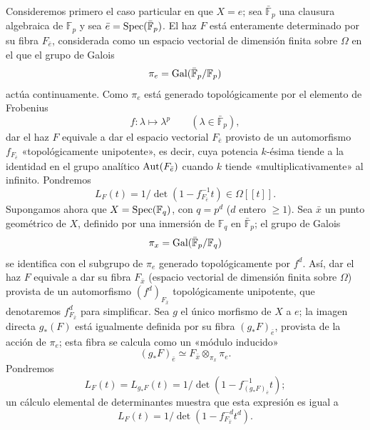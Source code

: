 Consideremos primero el caso particular en que $X=e$; sea $\bar{\mathbb F}_p$ una clausura algebraica de $\mathbb F_p$ y sea $\bar e=\operatorname{Spec}(\bar{\mathbb F}_p)$. El haz $F$ está enteramente determinado por su fibra $F_{\bar e}$, considerada como un espacio vectorial de dimensión finita sobre $\Omega$ en el que el grupo de Galois
\[
\pi_e=\operatorname{Gal}(\bar{\mathbb F}_p/\mathbb F_p)
\]
actúa continuamente. Como $\pi_e$ está generado topológicamente por el elemento de Frobenius
\[
f: \lambda\longmapsto \lambda^p\qquad(\lambda\in\bar{\mathbb F}_p),
\]
dar el haz $F$ equivale a dar el espacio vectorial $F_{\bar e}$ provisto de un automorfismo $f_{F_{\bar e}}$ «topológicamente unipotente», es decir, cuya potencia $k$-ésima tiende a la identidad en el grupo analítico $\operatorname{Aut}(F_{\bar e})$ cuando $k$ tiende «multiplicativamente» al infinito. Pondremos
\[
L_F(t)=1/\det(1-f_{F_{\bar e}}^{-1}t)\in\Omega[[t]].
\]
Supongamos ahora que $X=\operatorname{Spec}(\mathbb F_q)$, con $q=p^d$ ($d$ entero $\ge1$). Sea $\bar x$ un punto geométrico de $X$, definido por una inmersión de $\mathbb F_q$ en $\bar{\mathbb F}_p$; el grupo de Galois
\[
\pi_x=\operatorname{Gal}(\bar{\mathbb F}_p/\mathbb F_q)
\]
se identifica con el subgrupo de $\pi_e$ generado topológicamente por $f^d$. Así, dar el haz $F$ equivale a dar su fibra $F_{\bar x}$ (espacio vectorial de dimensión finita sobre $\Omega$) provista de un automorfismo $(f^d)_{F_{\bar x}}$ topológicamente unipotente, que denotaremos $f^d_{F_{\bar x}}$ para simplificar. Sea $g$ el único morfismo de $X$ a $e$; la imagen directa $g_*(F)$ está igualmente definida por su fibra $(g_*F)_{\bar e}$, provista de la acción de $\pi_e$; esta fibra se calcula como un «módulo inducido»
\[
(g_*F)_{\bar e}\simeq F_{\bar x}\otimes_{\pi_x}\pi_e.
\]
Pondremos
\[
L_F(t)=L_{g_*F}(t)=1/\det(1-f^{-1}_{(g_*F)_{\bar e}}t);
\]
un cálculo elemental de determinantes muestra que esta expresión es igual a
\[
L_F(t)=1/\det(1-f^{-d}_{F_{\bar x}}t^d).
\]
